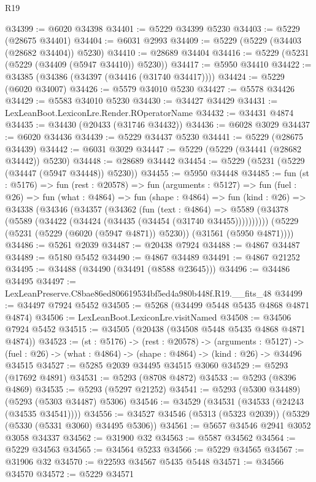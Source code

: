 \begin{lexlean}{R19}
\begin{coremodule}
@34399 := @6020 @34398
@34401 := @5229 @34399 @5230
@34403 := @5229 (@28675 @34401)
@34404 := @6031 @2993
@34409 := @5229 (@5229 (@34403 (@28682 @34404)) @5230)
@34410 := @28689 @34404
@34416 := @5229 (@5231 (@5229 (@34409 (@5947 @34410)) @5230))
@34417 := @5950 @34410
@34422 := @34385 (@34386 (@34397 (@34416 (@31740 @34417))))
@34424 := @5229 (@6020 @34007)
@34426 := @5579 @34010 @5230
@34427 := @5578 @34426
@34429 := @5583 @34010 @5230
@34430 := @34427 @34429
@34431 := LexLeanBoot.LexiconLre.Render.ROperatorName
@34432 := @34431 @4874
@34435 := @34430 (@20433 (@31746 @34432))
@34436 := @6028 @3029
@34437 := @6020 @34436
@34439 := @5229 @34437 @5230
@34441 := @5229 (@28675 @34439)
@34442 := @6031 @3029
@34447 := @5229 (@5229 (@34441 (@28682 @34442)) @5230)
@34448 := @28689 @34442
@34454 := @5229 (@5231 (@5229 (@34447 (@5947 @34448)) @5230))
@34455 := @5950 @34448
@34485 := fun (st : @5176) =>
  fun (rest : @20578) =>
  fun (arguments : @5127) =>
  fun (fuel : @26) =>
  fun (what : @4864) =>
  fun (shape : @4864) =>
  fun (kind : @26) =>
  @34338
    (@34346
      (@34357
        (@34362
          (fun (text : @4864) =>
          @5589 (@34378 (@5589 (@34422 (@34424 (@34435 (@34454 (@31740 @34455))))))))))
      (@5229 (@5231 (@5229 (@6020 (@5947 @4871)) @5230)) (@31561 (@5950 @4871))))
@34486 := @5261 @2039
@34487 := @20438 @7924
@34488 := @4867 @34487
@34489 := @5180 @5452
@34490 := @4867 @34489
@34491 := @4867 @21252
@34495 := @34488 (@34490 (@34491 (@8588 @23645)))
@34496 := @34486 @34495
@34497 := LexLeanPreserve.C8bae86ed806619534bf5ed4a980b448f.R19.__fits_48
@34499 := @34497 @7924 @5452
@34505 := @5268 (@34499 @5448 @5435 @4868 @4871 @4874)
@34506 := LexLeanBoot.LexiconLre.visitNamed
@34508 := @34506 @7924 @5452
@34515 := @34505 (@20438 (@34508 @5448 @5435 @4868 @4871 @4874))
@34523 := (st : @5176) ->
  (rest : @20578) ->
  (arguments : @5127) ->
  (fuel : @26) -> (what : @4864) -> (shape : @4864) -> (kind : @26) -> @34496 @34515
@34527 := @5285 @2039 @34495 @34515 @3060
@34529 := @5293 (@17692 @4891)
@34531 := @5293 (@8708 @4872)
@34533 := @5293 (@8396 @4869)
@34535 := @5293 (@5297 @21252)
@34541 := @5293 (@5300 @34489) (@5293 (@5303 @34487) @5306)
@34546 := @34529 (@34531 (@34533 (@24243 (@34535 @34541))))
@34556 := @34527 @34546 (@5313 (@5323 @2039)) (@5329 (@5330 (@5331 @3060) @34495 @5306))
@34561 := @5657 @34546 @2941 @3052 @3058 @34337
@34562 := @31900 @32
@34563 := @5587 @34562
@34564 := @5229 @34563
@34565 := @34564 @5233
@34566 := @5229 @34565
@34567 := @31906 @32
@34570 := @22593 @34567 @5435 @5448
@34571 := @34566 @34570
@34572 := @5229 @34571

\end{coremodule}
\end{lexlean}
